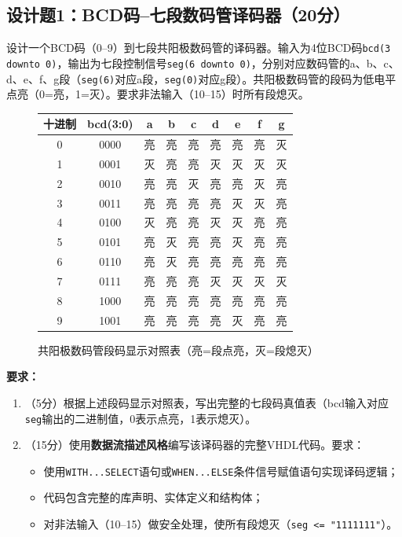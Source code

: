 \subsection*{设计题1：BCD码--七段数码管译码器（20分）}

设计一个BCD码（0--9）到七段共阳极数码管的译码器。输入为4位BCD码\texttt{bcd(3 downto 0)}，输出为七段控制信号\texttt{seg(6 downto 0)}，分别对应数码管的a、b、c、d、e、f、g段（\texttt{seg(6)}对应a段，\texttt{seg(0)}对应g段）。共阳极数码管的段码为低电平点亮（0=亮，1=灭）。要求非法输入（10--15）时所有段熄灭。

\vspace{0.3cm}

\begin{figure}[h]
\centering
\begin{tabular}{|c|c|c|c|c|c|c|c|c|}
\hline
\textbf{十进制} & \textbf{bcd(3:0)} & \textbf{a} & \textbf{b} & \textbf{c} & \textbf{d} & \textbf{e} & \textbf{f} & \textbf{g} \\
\hline
0 & 0000 & 亮 & 亮 & 亮 & 亮 & 亮 & 亮 & 灭 \\
1 & 0001 & 灭 & 亮 & 亮 & 灭 & 灭 & 灭 & 灭 \\
2 & 0010 & 亮 & 亮 & 灭 & 亮 & 亮 & 灭 & 亮 \\
3 & 0011 & 亮 & 亮 & 亮 & 亮 & 灭 & 灭 & 亮 \\
4 & 0100 & 灭 & 亮 & 亮 & 灭 & 灭 & 亮 & 亮 \\
5 & 0101 & 亮 & 灭 & 亮 & 亮 & 灭 & 亮 & 亮 \\
6 & 0110 & 亮 & 灭 & 亮 & 亮 & 亮 & 亮 & 亮 \\
7 & 0111 & 亮 & 亮 & 亮 & 灭 & 灭 & 灭 & 灭 \\
8 & 1000 & 亮 & 亮 & 亮 & 亮 & 亮 & 亮 & 亮 \\
9 & 1001 & 亮 & 亮 & 亮 & 亮 & 灭 & 亮 & 亮 \\
\hline
\end{tabular}
\caption{共阳极数码管段码显示对照表（亮=段点亮，灭=段熄灭）}
\label{tab:7seg}
\end{figure}

\vspace{0.3cm}

\textbf{要求：}
\begin{enumerate}[label=(\arabic*)]
  \item （5分）根据上述段码显示对照表，写出完整的七段码真值表（bcd输入对应\texttt{seg}输出的二进制值，0表示点亮，1表示熄灭）。
  \item （15分）使用\textbf{数据流描述风格}编写该译码器的完整VHDL代码。要求：
  \begin{itemize}
    \item 使用\texttt{WITH...SELECT}语句或\texttt{WHEN...ELSE}条件信号赋值语句实现译码逻辑；
    \item 代码包含完整的库声明、实体定义和结构体；
    \item 对非法输入（10--15）做安全处理，使所有段熄灭（\texttt{seg <= "1111111"}）。
  \end{itemize}
\end{enumerate}

